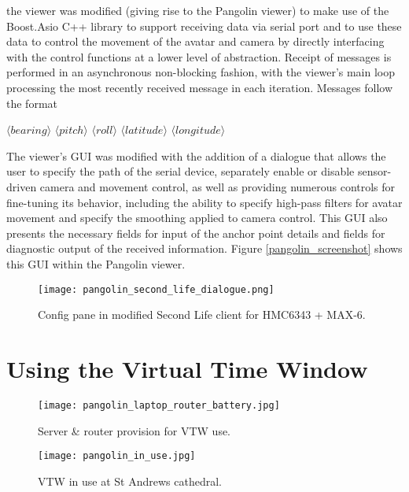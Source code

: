 the viewer was modified (giving rise to the Pangolin viewer) to make use of the Boost.Asio C++ library to support receiving data via serial port and to use these data to control the movement of the avatar and camera by directly interfacing with the control functions at a lower level of abstraction. Receipt of messages is performed in an asynchronous non-blocking fashion, with the viewer's main loop processing the most recently received message in each iteration. Messages follow the format

$\langle bearing \rangle$ $\langle pitch \rangle$ $\langle roll \rangle$ $\langle latitude \rangle$ $\langle longitude \rangle$

The viewer's GUI was modified with the addition of a dialogue that allows the user to specify the path of the serial device, separately enable or disable sensor-driven camera and movement control, as well as providing numerous controls for fine-tuning its behavior, including the ability to specify high-pass filters for avatar movement and specify the smoothing applied to camera control. This GUI also presents the necessary fields for input of the anchor point details and fields for diagnostic output of the received information. Figure \ref{pangolin_screenshot} shows this GUI within the Pangolin viewer.

\begin{figure}[h]
\centering
  \texttt{[image: pangolin\_second\_life\_dialogue.png]}
  \caption{Config pane in modified Second Life client for HMC6343 + MAX-6.}
  \label{pangolin_second_life_dialogue.png}
\end{figure}


\section{Using the Virtual Time Window}

\begin{figure}[h]
\centering
\begin{minipage}{.5\textwidth}
 	\centering
 	\texttt{[image: pangolin\_laptop\_router\_battery.jpg]}
 	\caption{Server \& router provision for VTW use.}
	\label{pangolin_laptop_router_battery.jpg}
\end{minipage}%
\begin{minipage}{.5\textwidth}
  \centering
  \texttt{[image: pangolin\_in\_use.jpg]}
    \caption{VTW in use at St Andrews cathedral.}
    \label{pangolin_in_use.jpg}
\end{minipage}
\end{figure}


